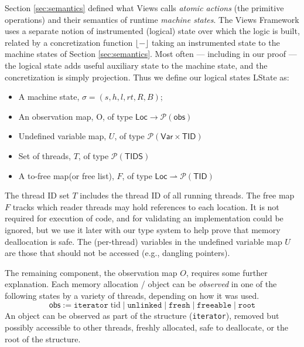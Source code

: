  Section \ref{sec:semantics} defined what Views calls \emph{atomic actions} (the primitive operations) and their semantics of runtime \emph{machine states}.  The Views Framework uses a separate notion of instrumented (logical) state over which the logic is built, related by a concretization function $\lfloor-\rfloor$ taking an instrumented state to the machine states of Section \ref{sec:semantics}.  Most often --- including in our proof ---  the logical state adds useful auxiliary state to the machine state, and the concretization is simply projection.
Thus we define our logical states \textsf{LState} as:
\begin{itemize}
\item A machine state, $\sigma=(s,h,l,rt,R,B)$;
\item An observation map, O, of type $ \textsf{Loc} \to \mathcal{P}(\textsf{obs})$
\item Undefined variable map, $U$, of type $\mathcal{P}(\textsf{Var}\times \textsf{TID})$
\item Set of threads, $T$, of type $\mathcal{P}(\textsf{TIDS})$
\item A to-free map(or free list), $F$, of type $\textsf{Loc} \rightharpoonup \mathcal{P}(\textsf{TID})$
\end{itemize}
The thread ID set $T$ includes the thread ID of all running threads.
The free map $F$ tracks which reader threads may hold references to each location. It is not required for execution of code, and for validating an implementation could be ignored, but we use it later with our type system to help prove that memory deallocation is safe.
The (per-thread) variables in the undefined variable map $U$ are those that should not be accessed (e.g., dangling pointers).

The remaining component, the observation map $O$, requires some further explanation.
Each memory allocation / object can be \emph{observed} in one of the following states by a variety of threads, depending on how it was used.
\[\textsf{obs} := \texttt{iterator} \; \mathrm{tid} \mid \texttt{unlinked} \mid \texttt{fresh} \mid \texttt{freeable} \mid \texttt{root}\]
An object can be observed as part of the structure (\texttt{iterator}), removed but possibly accessible to other threads, freshly allocated, safe to deallocate, or the root of the structure.


